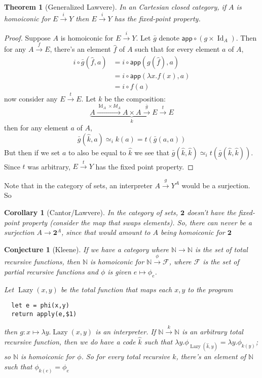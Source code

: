 \documentclass{article}
\newtheorem{theorem}{Theorem}
\newtheorem{corrolary}{Corollary}
\newtheorem{conjecture}{Conjecture}
\DeclareMathOperator{\Id}{Id}
\DeclareMathOperator{\Lazy}{Lazy}
\begin{document}
\begin{theorem}[Generalized Lawvere] In an Cartesian closed category, if $A$ is homoiconic for $E\xrightarrow{i}Y$ then $E\xrightarrow{i}Y$ has the fixed-point property.
\end{theorem}
\begin{proof}
  Suppose $A$ is homoiconic for $E\xrightarrow{i}Y$. Let $\bar{g}$ denote $\mathsf{app} \circ
  (g\times \Id_A)$. Then for any $A\xrightarrow{f}E$, there's an element
  $\hat{f}$ of $A$ such that for every element $a$ of $A$, 
  \begin{align*}
    i\circ \bar{g}(\hat{f}, a) &= i\circ \mathsf{app}(g(\hat{f}),a)  \\
                        &= i\circ \mathsf{app}(\lambda x. f(x),a)\\
                        &= i\circ f(a)
  \end{align*}
  now consider any $E\xrightarrow{t}E$. Let $k$ be the composition:
  \[\underbrace{A\xrightarrow{\Id_A\times Id_A} A\times A\xrightarrow{\bar{g}}E\xrightarrow{t}E}_k\]
  then for any element $a$ of $A$,
  \[\bar{g}(\hat{k}, a) \simeq_i k(a) = t(\bar{g}(a,a))\]
  But then if we set $a$ to also be equal to $\hat{k}$ we see that $\bar{g}(\hat{k},\hat{k})\simeq_i t(\bar{g}(\hat{k},\hat{k}))$. Since $t$ was arbitrary, $E\xrightarrow{t}Y$ has the fixed point property.
\end{proof}

Note that in the category of sets, an interpreter $A\xrightarrow{g}Y^A$ would be
a surjection. So

\begin{corrolary}[Cantor/Lawvere] In the category of sets, $\mathbf{2}$ doesn't have the
  fixed-point property (consider the map that swaps elements). So, there can
  never be a surjection $A\rightarrow \mathbf{2}^A$, since that would amount to
  $A$ being homoiconic for $\mathbf{2}$
\end{corrolary}

\begin{conjecture}[Kleene] If we have a category where
  $\mathbb{N}\rightarrow\mathbb{N}$ is the set of total recursive functions,
  then $\mathbb{N}$ is homoiconic for $\mathbb{N}\xrightarrow{\phi}\mathcal{F}$,
  where $\mathcal{F}$ is the set of partial recursive functions and $\phi$ is 
  given $e\mapsto\phi_e$.

  Let $\Lazy(x,y)$ be the total function that maps each $x,y$ to the program
  \begin{verbatim}
  let e = phi(x,y)
  return apply(e,$1)
  \end{verbatim}
  then $g:x\mapsto \lambda y.\Lazy(x,y)$ is an interpreter. If
  $\mathbb{N}\xrightarrow{k}\mathbb{N}$ is an
  arbitrary total recursive function, then we do have a code $\hat{k}$ such that
  $\lambda y.\phi_{\Lazy(\hat{k},y)} = \lambda y.\phi_{k(y)}$; so $\mathbb{N}$ is
  homoiconic for $\phi$. So for every total recursive $k$, there's an element of
  $\mathbb{N}$ such that $\phi_{k(e)} = \phi_e $
\end{conjecture}
\end{document}
